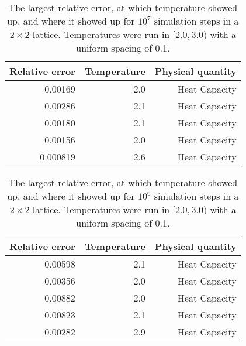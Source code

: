 \documentclass[10pt,a4paper]{article}
\begin{document}
\begin{table}[H]
\centering
\caption[$2\times2$ lattice rel. errors with  $10^7$ simulation steps]{The largest relative error, at which temperature showed up, and where it showed up for $10^7$ simulation steps in a $2\times2$ lattice. Temperatures were run in $[2.0,3.0)$ with a uniform spacing of 0.1.}
\begin{tabular}{|r|r|r|}
\hline
Relative error & Temperature & Physical quantity \\ \hline
0.00169        & 2.0         & Heat Capacity     \\ \hline
0.00286        & 2.1         & Heat Capacity     \\ \hline
0.00180        & 2.1         & Heat Capacity     \\ \hline
0.00156        & 2.0         & Heat Capacity     \\ \hline
0.000819       & 2.6         & Heat Capacity     \\ \hline
\end{tabular}\label{Table 3}
\end{table}
\begin{table}[H]
\centering
\caption[$2\times2$ lattice rel. errors with  $10^6$ simulation steps]{The largest relative error, at which temperature showed up, and where it showed up for $10^6$ simulation steps in a $2\times2$ lattice. Temperatures were run in $[2.0,3.0)$ with a uniform spacing of 0.1.}
\begin{tabular}{|r|r|r|}
\hline
Relative error & Temperature & Physical quantity \\ \hline
0.00598     & 2.1         & Heat Capacity     \\ \hline
0.00356        & 2.0        & Heat Capacity     \\ \hline
0.00882        & 2.0        & Heat Capacity     \\ \hline
0.00823        & 2.1        & Heat Capacity     \\ \hline
0.00282       & 2.9         & Heat Capacity     \\ \hline
\end{tabular}\label{Table 4}
\end{table}
\end{document}
